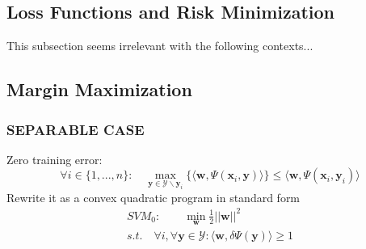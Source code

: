 \documentclass[12pt,a4paper,twoside]{article}
\begin{document}
\subsection{Loss Functions and Risk Minimization}
This subsection seems irrelevant with the following contexts...
\subsection{Margin Maximization}
\subsubsection{SEPARABLE CASE}
Zero training error:
\[
\forall i \in \{1,...,n\}:\quad \max_{\mathbf{y}\in\mathcal{Y}\backslash\mathbf{y}_i}
\{\langle \mathbf{w},\Psi(\mathbf{x}_i,\mathbf{y})\rangle\}\leq
\langle \mathbf{w},\Psi(\mathbf{x}_i,\mathbf{y}_i)\rangle
\]
Rewrite it as a convex quadratic program in standard form
\begin{eqnarray}
SVM_0:\qquad \min_{\mathbf{w}}\frac{1}{2}||\mathbf{w}||^2\\
s.t.\quad \forall i, \forall \mathbf{y}\in \mathcal{Y}:
\langle\mathbf{w},\delta \Psi(\mathbf{y})\rangle \geq 1
\end{eqnarray}
\end{document}
